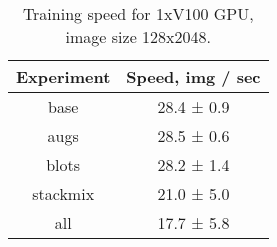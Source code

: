 \documentclass[10pt,twocolumn,letterpaper]{article}
\begin{document}
\begin{table}

    \begin{center}
    \begin{tabular}{ |c|c| }
    \hline
\textbf{Experiment} &  \textbf{Speed, img / sec}  \\
\hline
    base & 28.4 ± 0.9 \\
    augs & 28.5 ± 0.6 \\
    blots & 28.2 ± 1.4 \\
    stackmix & 21.0 ± 5.0 \\
    all & 17.7 ± 5.8 \\
\hline
    \end{tabular}
    \end{center}
    \caption{\label{tab:inference_speed2}Training speed for 1xV100 GPU, image size 128x2048.}
\end{table}
\end{document}
